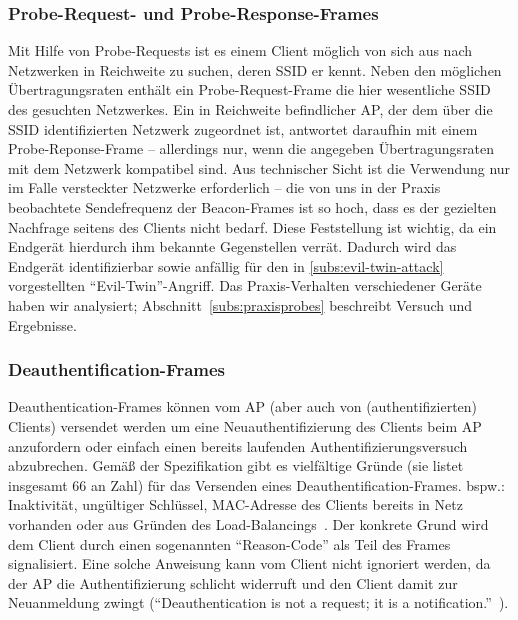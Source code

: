 \subsubsection{Probe-Request- und Probe-Response-Frames}\label{subs:probes}
Mit Hilfe von Probe-Requests ist es einem Client möglich von sich aus nach Netzwerken in Reichweite zu suchen, deren SSID er kennt. 
Neben den möglichen Übertragungsraten enthält ein Probe-Request-Frame die hier wesentliche SSID des gesuchten Netzwerkes. 
Ein in Reichweite befindlicher AP, der dem über die SSID identifizierten Netzwerk zugeordnet ist, antwortet daraufhin mit einem Probe-Reponse-Frame -- allerdings nur, wenn die angegeben Übertragungsraten mit dem Netzwerk kompatibel sind. 
Aus technischer Sicht ist die Verwendung nur im Falle versteckter Netzwerke erforderlich -- die von uns in der Praxis beobachtete Sendefrequenz der Beacon-Frames ist so hoch, dass es der gezielten Nachfrage seitens des Clients nicht bedarf. 
Diese Feststellung ist wichtig, da ein Endgerät hierdurch ihm bekannte Gegenstellen verrät. 
Dadurch wird das Endgerät identifizierbar sowie anfällig für den in \ref{subs:evil-twin-attack} vorgestellten \enquote{Evil-Twin}-Angriff. 
Das Praxis-Verhalten verschiedener Geräte haben wir analysiert; Abschnitt~\ref{subs:praxisprobes} beschreibt Versuch und Ergebnisse.

\subsubsection{Deauthentification-Frames}\label{subs:deauthentication-frames}
Deauthentication-Frames können vom AP (aber auch von (authentifizierten) Clients) versendet werden um eine Neuauthentifizierung des Clients beim AP anzufordern oder einfach einen bereits laufenden Authentifizierungsversuch abzubrechen. 
Gemäß der Spezifikation gibt es vielfältige Gründe (sie listet insgesamt 66 an Zahl) für das Versenden eines Deauthentification-Frames. bspw.: Inaktivität, ungültiger Schlüssel, MAC-Adresse des Clients bereits in Netz vorhanden oder aus Gründen des Load-Balancings~\cite[S. 74, S. 442]{ieee802.11}.
Der konkrete Grund wird dem Client durch einen sogenannten \enquote{Reason-Code} als Teil des Frames signalisiert. 
Eine solche Anweisung kann vom Client nicht ignoriert werden, da der AP die Authentifizierung schlicht widerruft und den Client damit zur Neuanmeldung zwingt (\enquote{Deauthentication is not a request; it is a notification.}~\cite[S. 74]{ieee802.11}).
 
